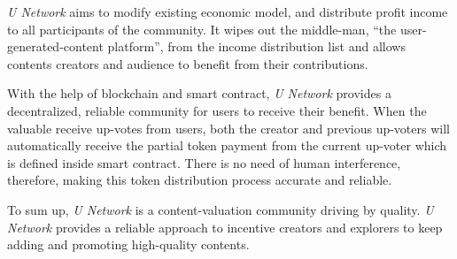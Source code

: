 \emph{U Network} aims to modify existing economic model, and distribute profit income to all participants of the community. It wipes out the middle-man, ``the user-generated-content platform'',  from the income distribution list and allows contents creators and audience to benefit from their contributions. 

With the help of blockchain and smart contract, \emph{U Network} provides a decentralized, reliable community for users to receive their benefit. When the valuable receive up-votes from users, both the creator and previous up-voters will automatically receive the partial token payment from the current up-voter which is defined inside smart contract. There is no need of human interference, therefore, making this token distribution process accurate and reliable.  

To sum up, \emph{U Network}  is a content-valuation community driving by quality. \emph{U Network} provides a reliable approach to incentive creators and explorers to keep adding and promoting high-quality contents. 